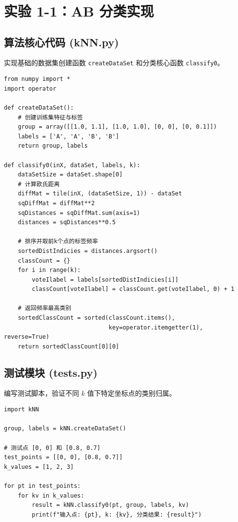\documentclass[10.5pt]{config}
\begin{document}
\section{实验 1-1：AB 分类实现}

\subsection{算法核心代码 (kNN.py)}
实现基础的数据集创建函数 \texttt{createDataSet} 和分类核心函数 \texttt{classify0}。

\begin{verbatim}
from numpy import *
import operator

def createDataSet():
    # 创建训练集特征与标签
    group = array([[1.0, 1.1], [1.0, 1.0], [0, 0], [0, 0.1]])
    labels = ['A', 'A', 'B', 'B']
    return group, labels

def classify0(inX, dataSet, labels, k):
    dataSetSize = dataSet.shape[0]
    # 计算欧氏距离
    diffMat = tile(inX, (dataSetSize, 1)) - dataSet
    sqDiffMat = diffMat**2
    sqDistances = sqDiffMat.sum(axis=1)
    distances = sqDistances**0.5

    # 排序并取前k个点的标签频率
    sortedDistIndicies = distances.argsort()
    classCount = {}
    for i in range(k):
        voteIlabel = labels[sortedDistIndicies[i]]
        classCount[voteIlabel] = classCount.get(voteIlabel, 0) + 1

    # 返回频率最高类别
    sortedClassCount = sorted(classCount.items(),
                              key=operator.itemgetter(1), reverse=True)
    return sortedClassCount[0][0]
\end{verbatim}

\subsection{测试模块 (tests.py)}
编写测试脚本，验证不同 $k$ 值下特定坐标点的类别归属。

\begin{verbatim}
import kNN

group, labels = kNN.createDataSet()

# 测试点 [0, 0] 和 [0.8, 0.7]
test_points = [[0, 0], [0.8, 0.7]]
k_values = [1, 2, 3]

for pt in test_points:
    for kv in k_values:
        result = kNN.classify0(pt, group, labels, kv)
        print(f"输入点: {pt}, k: {kv}, 分类结果: {result}")
\end{verbatim}
\end{document}
